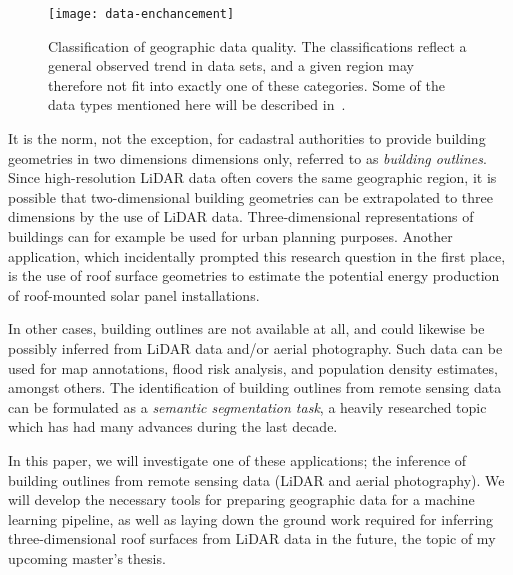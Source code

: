 \begin{figure}[htb]
  \texttt{[image: data-enchancement]}
  \caption{
    Classification of geographic data quality.
    The classifications reflect a general observed trend in data sets, and a given region may therefore not fit into exactly one of these categories.
    Some of the data types mentioned here will be described in~.
  }%
  \label{fig:data-enchancement}
\end{figure}

It is the norm, not the exception, for cadastral authorities to provide building geometries in two dimensions dimensions only, referred to as \textit{building outlines}.
Since high-resolution LiDAR data often covers the same geographic region, it is possible that two-dimensional building geometries can be extrapolated to three dimensions by the use of LiDAR data.
Three-dimensional representations of buildings can for example be used for urban planning purposes.
Another application, which incidentally prompted this research question in the first place, is the use of roof surface geometries to estimate the potential energy production of roof-mounted solar panel installations.

In other cases, building outlines are not available at all, and could likewise be possibly inferred from LiDAR data and/or aerial photography.
Such data can be used for map annotations, flood risk analysis, and population density estimates, amongst others.
The identification of building outlines from remote sensing data can be formulated as a \textit{semantic segmentation task}, a heavily researched topic which has had many advances during the last decade.

In this paper, we will investigate one of these applications; the inference of building outlines from remote sensing data (LiDAR and aerial photography).
We will develop the necessary tools for preparing geographic data for a machine learning pipeline, as well as laying down the ground work required for inferring three-dimensional roof surfaces from LiDAR data in the future, the topic of my upcoming master's thesis.



